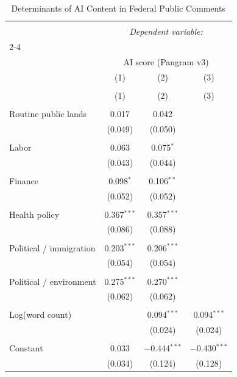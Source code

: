 
\begin{table}[!htbp] \centering 
  \caption{Determinants of AI Content in Federal Public Comments} 
  \label{} 
\begin{tabular}{@{\extracolsep{5pt}}lccc} 
\\[-1.8ex]\hline 
\hline \\[-1.8ex] 
 & \multicolumn{3}{c}{\textit{Dependent variable:}} \\ 
\cline{2-4} 
\\[-1.8ex] & \multicolumn{3}{c}{AI score (Pangram v3)} \\ 
 & (1) & (2) & (3) \\ 
\\[-1.8ex] & (1) & (2) & (3)\\ 
\hline \\[-1.8ex] 
 Routine public lands & 0.017 & 0.042 &  \\ 
  & (0.049) & (0.050) &  \\ 
  & & & \\ 
 Labor & 0.063 & 0.075$^{*}$ &  \\ 
  & (0.043) & (0.044) &  \\ 
  & & & \\ 
 Finance & 0.098$^{*}$ & 0.106$^{**}$ &  \\ 
  & (0.052) & (0.052) &  \\ 
  & & & \\ 
 Health policy & 0.367$^{***}$ & 0.357$^{***}$ &  \\ 
  & (0.086) & (0.088) &  \\ 
  & & & \\ 
 Political / immigration & 0.203$^{***}$ & 0.206$^{***}$ &  \\ 
  & (0.054) & (0.054) &  \\ 
  & & & \\ 
 Political / environment & 0.275$^{***}$ & 0.270$^{***}$ &  \\ 
  & (0.062) & (0.062) &  \\ 
  & & & \\ 
 Log(word count) &  & 0.094$^{***}$ & 0.094$^{***}$ \\ 
  &  & (0.024) & (0.024) \\ 
  & & & \\ 
 Constant & 0.033 & $-$0.444$^{***}$ & $-$0.430$^{***}$ \\ 
  & (0.034) & (0.124) & (0.128) \\ 

\end{tabular}
\end{table}
